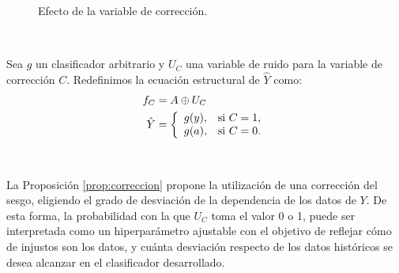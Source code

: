 \documentclass[oneside,openright,titlepage,numbers=noenddot,openany,headinclude,footinclude=true,
cleardoublepage=empty,abstractoff,BCOR=5mm,paper=a4,fontsize=12pt,main=spanish]{scrreprt}
\begin{document}
\begin{figure}[h]
\centering
{}
\caption{Efecto de la variable de corrección.}
\label{fig:effectcorrec}
\end{figure}\

\begin{proposition} 
Sea $g$ un clasificador arbitrario y $U_C$ una variable de ruido para la variable de corrección $C$. Redefinimos la ecuación estructural de $\hat{Y}$ como:
\begin{equation*}
\begin{split}
    f_C &= A \oplus U_C \\
    \hat{Y} &= \left \{
\begin{array}{l l}
g(y), & \mbox{si } C = 1, \\
g(a), & \mbox{si } C =0.
\end{array}
\right.
\end{split}
\end{equation*}
\label{prop:correccion}
\end{proposition}\

La Proposición \ref{prop:correccion} propone la utilización de una corrección del sesgo, eligiendo el grado de desviación de la dependencia de los datos de $Y$. De esta forma, la probabilidad con la que $U_C$ toma el valor 0 o 1, puede ser interpretada como un hiperparámetro ajustable con el objetivo de reflejar cómo de injustos son los datos, y cuánta desviación respecto de los datos históricos se desea alcanzar en el clasificador desarrollado.
\end{document}
